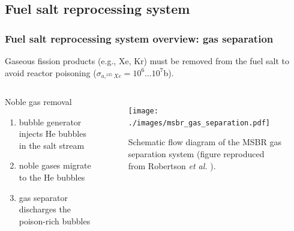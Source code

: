 \subsection{Fuel salt reprocessing system}

\begin{frame}
  \frametitle{Fuel salt reprocessing system overview: gas separation}
  Gaseous fission products (e.g., Xe, Kr) must be removed from the fuel salt 
  to avoid reactor poisoning ($\sigma_{a,^{135}Xe}=10^6\dots10^7$b). 
  
      \begin{columns}
      	\column[t]{4.0cm}
    \begin{block}{Noble gas removal}
      \begin{enumerate}
      	\item[\textcolor{blue}{\textbullet}] bubble generator injects He 
      	bubbles in the salt stream
      	\item[\textcolor{green}{\textbullet}] noble gases migrate to the He 
      	bubbles 
      	\item[\textcolor{red}{\textbullet}] gas separator discharges the 
      	poison-rich bubbles
      \end{enumerate}
    \end{block}    	
      	
     	\column[t]{8cm}
  \begin{figure}[t]
	  \centering
	  		\vspace{-4mm}
		\texttt{[image: ./images/msbr\_gas\_separation.pdf]}
	\caption{Schematic flow diagram of the \gls{MSBR} gas separation system 
	(figure reproduced from Robertson \emph{et al.}  
	\cite{robertson_conceptual_1971}).} 
    \end{figure}

	\end{columns}
\end{frame}

